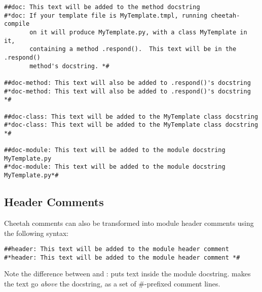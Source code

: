 \begin{verbatim}
##doc: This text will be added to the method docstring
#*doc: If your template file is MyTemplate.tmpl, running cheetah-compile
       on it will produce MyTemplate.py, with a class MyTemplate in it,
       containing a method .respond().  This text will be in the .respond()
       method's docstring. *#

##doc-method: This text will also be added to .respond()'s docstring
#*doc-method: This text will also be added to .respond()'s docstring *#

##doc-class: This text will be added to the MyTemplate class docstring
#*doc-class: This text will be added to the MyTemplate class docstring *#

##doc-module: This text will be added to the module docstring MyTemplate.py
#*doc-module: This text will be added to the module docstring MyTemplate.py*#
\end{verbatim}

\subsection{Header Comments}
\label{comments.headers}
Cheetah comments can also be transformed into module header comments using the
following syntax:

\begin{verbatim}
##header: This text will be added to the module header comment
#*header: This text will be added to the module header comment *#
\end{verbatim}

Note the difference between  and :
 puts  text inside the module docstring.   makes the text go {\em above} the docstring, as a
set of \#-prefixed comment lines.


